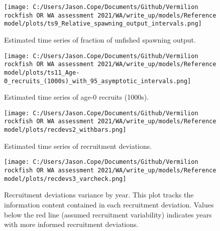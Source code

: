 \documentclass[11pt,
  english,
  a4paper,
]{article}
\begin{document}
\tagmcend\tagstructend


\begin{figure}
\centering
\texttt{[image: C:/Users/Jason.Cope/Documents/Github/Vermilion rockfish OR WA assessment 2021/WA/write\_up/models/Reference model/plots/ts9\_Relative\_spawning\_output\_intervals.png]}
\caption{Estimated time series of fraction of unfished spawning output.\label{fig:depl}}
\end{figure}

\tagmcend\tagstructend


\begin{figure}
\centering
\texttt{[image: C:/Users/Jason.Cope/Documents/Github/Vermilion rockfish OR WA assessment 2021/WA/write\_up/models/Reference model/plots/ts11\_Age-0\_recruits\_(1000s)\_with\_95\_asymptotic\_intervals.png]}
\caption{Estimated time series of age-0 recruits (1000s).\label{fig:recruits}}
\end{figure}

\tagmcend\tagstructend


\begin{figure}
\centering
\texttt{[image: C:/Users/Jason.Cope/Documents/Github/Vermilion rockfish OR WA assessment 2021/WA/write\_up/models/Reference model/plots/recdevs2\_withbars.png]}
\caption{Estimated time series of recruitment deviations.\label{fig:rec-devs}}
\end{figure}

\tagmcend\tagstructend


\begin{figure}
\centering
\texttt{[image: C:/Users/Jason.Cope/Documents/Github/Vermilion rockfish OR WA assessment 2021/WA/write\_up/models/Reference model/plots/recdevs3\_varcheck.png]}
\caption{Recruitment deviations variance by year. This plot tracks the information content contained in each recruitment deviation. Values below the red line (assumed recruitment variability) indicates years with more informed recruitment deviations.\label{fig:rec-devs-sigmas}}
\end{figure}
\end{document}
